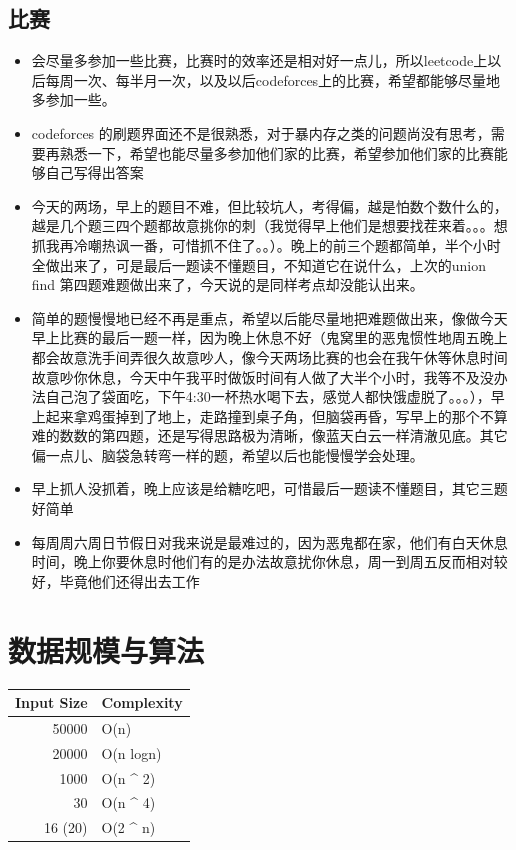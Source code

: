 \documentclass[9pt, b5paaper]{book}
\begin{document}
\section{比赛}
\label{sec-1-2}
\begin{itemize}
\item 会尽量多参加一些比赛，比赛时的效率还是相对好一点儿，所以leetcode上以后每周一次、每半月一次，以及以后codeforces上的比赛，希望都能够尽量地多参加一些。
\item codeforces 的刷题界面还不是很熟悉，对于暴内存之类的问题尚没有思考，需要再熟悉一下，希望也能尽量多参加他们家的比赛，希望参加他们家的比赛能够自己写得出答案

\item 今天的两场，早上的题目不难，但比较坑人，考得偏，越是怕数个数什么的，越是几个题三四个题都故意挑你的刺（我觉得早上他们是想要找茬来着。。。想抓我再冷嘲热讽一番，可惜抓不住了。。）。晚上的前三个题都简单，半个小时全做出来了，可是最后一题读不懂题目，不知道它在说什么，上次的union find 第四题难题做出来了，今天说的是同样考点却没能认出来。
\item 简单的题慢慢地已经不再是重点，希望以后能尽量地把难题做出来，像做今天早上比赛的最后一题一样，因为晚上休息不好（鬼窝里的恶鬼惯性地周五晚上都会故意洗手间弄很久故意吵人，像今天两场比赛的也会在我午休等休息时间故意吵你休息，今天中午我平时做饭时间有人做了大半个小时，我等不及没办法自己泡了袋面吃，下午4:30一杯热水喝下去，感觉人都快饿虚脱了。。。），早上起来拿鸡蛋掉到了地上，走路撞到桌子角，但脑袋再昏，写早上的那个不算难的数数的第四题，还是写得思路极为清晰，像蓝天白云一样清澈见底。其它偏一点儿、脑袋急转弯一样的题，希望以后也能慢慢学会处理。
\item 早上抓人没抓着，晚上应该是给糖吃吧，可惜最后一题读不懂题目，其它三题好简单
\item 每周周六周日节假日对我来说是最难过的，因为恶鬼都在家，他们有白天休息时间，晚上你要休息时他们有的是办法故意扰你休息，周一到周五反而相对较好，毕竟他们还得出去工作
\end{itemize}

\chapter{数据规模与算法}
\label{sec-2}
\begin{center}
\begin{tabular}{rl}
\hline
Input Size & Complexity\\
\hline
50000 & O(n)\\
20000 & O(n logn)\\
\hline
1000 & O(n \^{} 2)\\
30 & O(n \^{} 4)\\
16 (20) & O(2 \^{} n)\\
\hline
\end{tabular}
\end{center}
\end{document}
